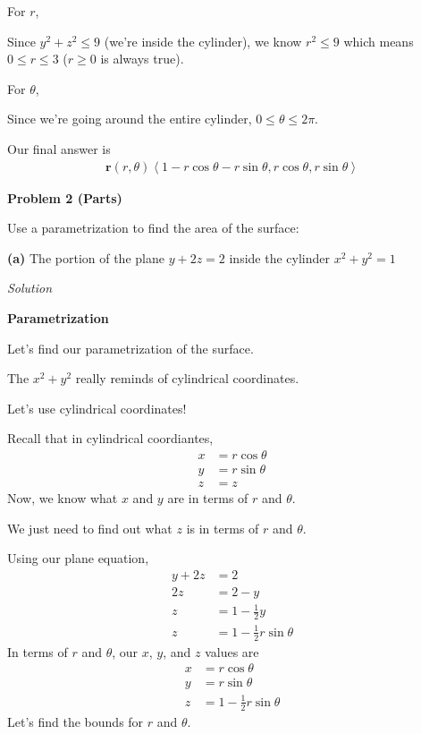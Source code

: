 \documentclass{article}
\newcommand{\lra}[1]{\left\langle #1 \right\rangle}
\renewcommand{\r}[0]{\mathbf{r}}
\newcommand{\Solution}{\textit{Solution}}
\begin{document}
For $r$,

Since $y^2+z^2\leq 9$ (we're inside the cylinder), we know $r^2\leq 9$
 which means $0\leq r\leq 3$ ($r\geq 0$ is always true).
 
For $\theta$,

Since we're going around the entire cylinder, $0\leq \theta\leq 2\pi$.

Our final answer is
\begin{align*}
    \boxed{\r(r,\theta)\lra{1-r\cos\theta-r\sin\theta,r\cos\theta,r\sin\theta}}\tag{$0\leq r\leq 3$, $0\leq \theta\leq 2\pi$}
\end{align*}
 
{}\textbf{Problem 2 (Parts)}

Use a parametrization to find the area of the surface:

{}\textbf{(a)} The portion of the plane $y+2z=2$ inside the cylinder $x^2+y^2=1$

\Solution

{}
\textbf{Parametrization}

Let's find our parametrization of the surface.

The $x^2+y^2$ really reminds of cylindrical coordinates.

Let's use cylindrical coordinates!

Recall that in cylindrical coordiantes,
\begin{align*}
    x&=r\cos\theta\\
    y&=r\sin\theta\\
    z&=z
\end{align*}
Now, we know what $x$ and $y$ are in terms of $r$ and $\theta$.

We just need to find out what $z$ is in terms of $r$ and $\theta$.

Using our plane equation,
\begin{align*}
    y+2z&=2\\
    2z&=2-y\\
    z&=1-\frac{1}{2}y\\
    z&=1-\frac{1}{2}r\sin\theta
\end{align*}
In terms of $r$ and $\theta$, our $x$, $y$, and $z$ values are
\begin{align*}
    x&=r\cos\theta\\
    y&=r\sin\theta\\
    z&=1-\frac{1}{2}r\sin\theta
\end{align*}
Let's find the bounds for $r$ and 
$\theta$.
\end{document}
